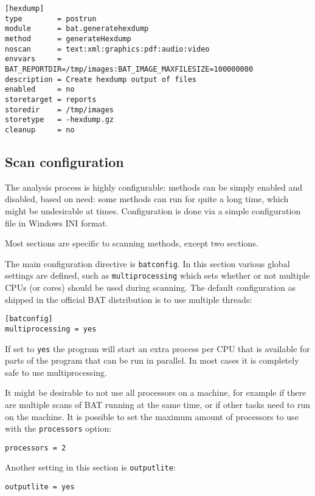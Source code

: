 \documentclass[10pt]{article}
\begin{document}
\begin{verbatim}
[hexdump]
type        = postrun
module      = bat.generatehexdump
method      = generateHexdump
noscan      = text:xml:graphics:pdf:audio:video
envvars     = BAT_REPORTDIR=/tmp/images:BAT_IMAGE_MAXFILESIZE=100000000
description = Create hexdump output of files
enabled     = no
storetarget = reports
storedir    = /tmp/images
storetype   = -hexdump.gz
cleanup     = no
\end{verbatim}

\subsection{Scan configuration}

The analysis process is highly configurable: methods can be simply enabled and
disabled, based on need: some methods can run for quite a long time, which
might be undesirable at times. Configuration is done via a simple configuration
file in Windows INI format.

Most sections are specific to scanning methods, except two sections.

The main configuration directive is \texttt{batconfig}. In this
section various global settings are defined, such as \texttt{multiprocessing}
which sets whether or not multiple CPUs (or cores) should be used during
scanning. The default configuration as shipped in the official BAT distribution
is to use multiple threads:

\begin{verbatim}
[batconfig]
multiprocessing = yes
\end{verbatim}

If set to \texttt{yes} the program will start an extra process per CPU that is
available for parts of the program that can be run in parallel. In most cases
it is completely safe to use multiprocessing.

It might be desirable to not use all processors on a machine, for example if
there are multiple scans of BAT running at the same time, or if other tasks
need to run on the machine. It is possible to set the maximum amount of
processors to use with the \texttt{processors} option:

\begin{verbatim}
processors = 2
\end{verbatim}

Another setting in this section is \texttt{outputlite}:

\begin{verbatim}
outputlite = yes
\end{verbatim}
\end{document}
